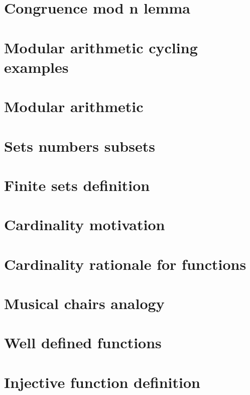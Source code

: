 \section*{Congruence mod n lemma}

\vfill
\section*{Modular arithmetic cycling examples}

\vfill
\section*{Modular arithmetic}

\vfill
\section*{Sets numbers subsets}

\vfill
\section*{Finite sets definition}

\vfill
\section*{Cardinality motivation}

\vfill
\section*{Cardinality rationale for functions}

\vfill
\section*{Musical chairs analogy}

\vfill
\section*{Well defined functions}

\vfill
\section*{Injective function definition}

\vfill

